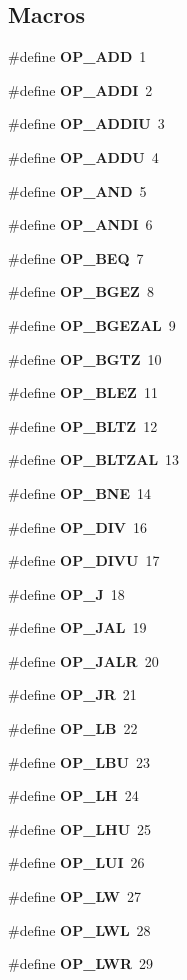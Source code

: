 \subsection*{Macros}
\begin{DoxyCompactItemize}
\item 
\#define {\bf O\+P\+\_\+\+A\+DD}~1
\item 
\#define {\bf O\+P\+\_\+\+A\+D\+DI}~2
\item 
\#define {\bf O\+P\+\_\+\+A\+D\+D\+IU}~3
\item 
\#define {\bf O\+P\+\_\+\+A\+D\+DU}~4
\item 
\#define {\bf O\+P\+\_\+\+A\+ND}~5
\item 
\#define {\bf O\+P\+\_\+\+A\+N\+DI}~6
\item 
\#define {\bf O\+P\+\_\+\+B\+EQ}~7
\item 
\#define {\bf O\+P\+\_\+\+B\+G\+EZ}~8
\item 
\#define {\bf O\+P\+\_\+\+B\+G\+E\+Z\+AL}~9
\item 
\#define {\bf O\+P\+\_\+\+B\+G\+TZ}~10
\item 
\#define {\bf O\+P\+\_\+\+B\+L\+EZ}~11
\item 
\#define {\bf O\+P\+\_\+\+B\+L\+TZ}~12
\item 
\#define {\bf O\+P\+\_\+\+B\+L\+T\+Z\+AL}~13
\item 
\#define {\bf O\+P\+\_\+\+B\+NE}~14
\item 
\#define {\bf O\+P\+\_\+\+D\+IV}~16
\item 
\#define {\bf O\+P\+\_\+\+D\+I\+VU}~17
\item 
\#define {\bf O\+P\+\_\+J}~18
\item 
\#define {\bf O\+P\+\_\+\+J\+AL}~19
\item 
\#define {\bf O\+P\+\_\+\+J\+A\+LR}~20
\item 
\#define {\bf O\+P\+\_\+\+JR}~21
\item 
\#define {\bf O\+P\+\_\+\+LB}~22
\item 
\#define {\bf O\+P\+\_\+\+L\+BU}~23
\item 
\#define {\bf O\+P\+\_\+\+LH}~24
\item 
\#define {\bf O\+P\+\_\+\+L\+HU}~25
\item 
\#define {\bf O\+P\+\_\+\+L\+UI}~26
\item 
\#define {\bf O\+P\+\_\+\+LW}~27
\item 
\#define {\bf O\+P\+\_\+\+L\+WL}~28
\item 
\#define {\bf O\+P\+\_\+\+L\+WR}~29
\item 

\end{DoxyCompactItemize}
